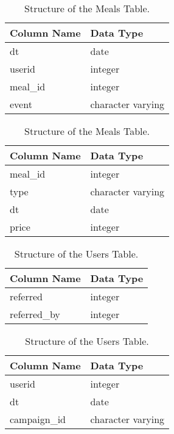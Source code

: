 \documentclass[]{article}
\begin{document}
\begin{table}[!htb]
	\begin{minipage}{.5\linewidth}
		\caption{Structure of the Events Table.}
		\centering
		\begin{tabular}{|l|l|} 
			\hline
			\textbf{Column Name} & \textbf{Data Type} \\
			\hline
			dt & date \\
			userid & integer\\
			meal\_id & integer\\
			event & character varying\\
			\hline
		\end{tabular}
	\end{minipage}%
	\begin{minipage}{.5\linewidth}
		\centering
		\caption{Structure of the Meals Table.}
		\begin{tabular}{|l|l|} 
			\hline
			\textbf{Column Name} & \textbf{Data Type} \\
			\hline
			meal\_id & integer \\
			type & character varying\\
			dt & date\\
			price & integer\\
			\hline
		\end{tabular}
	\end{minipage} 
\end{table}

\begin{table}[!htb]
	\begin{minipage}{.5\linewidth}
		\caption{Structure of the Referrals Table.}
		\centering
		\begin{tabular}{|l|l|} 
			\hline
			\textbf{Column Name} & \textbf{Data Type} \\
			\hline
			referred & integer \\
			referred\_by & integer\\
			\hline
		\end{tabular}
	\end{minipage}%
	\begin{minipage}{.5\linewidth}
		\centering
		\caption{Structure of the Users Table.}
		\begin{tabular}{|l|l|} 
			\hline
			\textbf{Column Name} & \textbf{Data Type} \\
			\hline
			userid & integer \\
			dt & date\\
			campaign\_id & character varying\\
			\hline
		\end{tabular}
	\end{minipage} 
\end{table}
\end{document}
